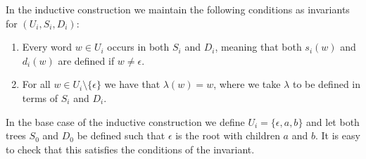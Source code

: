 \documentclass[a4paper]{article}
\begin{document}
In the inductive construction we maintain the following conditions as
invariants for $(U_i,S_i,D_i)$:
\begin{enumerate}
 \item Every word $w \in U_i$ occurs in both $S_i$ and $D_i$, meaning
that both $s_i(w)$ and $d_i(w)$ are defined if $w \neq \epsilon$.
 \item For all $w \in U_i \setminus \{\epsilon\}$ we have that
$\lambda(w) = w$, where we take $\lambda$ to be defined in terms of
$S_i$ and $D_i$.
\end{enumerate}

In the base case of the inductive construction we define $U_i =
\{\epsilon, a, b\}$ and let both trees $S_0$ and $D_0$ be defined such
that $\epsilon$ is the root with children $a$ and $b$. It is easy to
check that this satisfies the conditions of the invariant.
\end{document}
